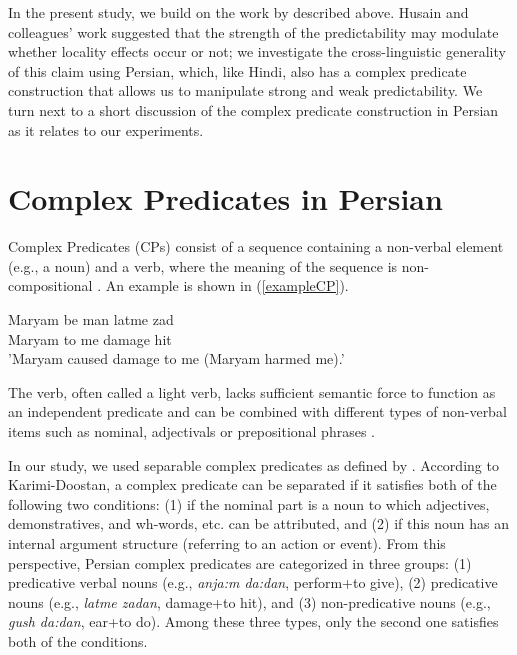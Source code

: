 \documentclass{frontiersSCNS}\usepackage{knitr} %
\begin{document}
In the present study, we build on the work by \cite{husain2014strong} described above. Husain and colleagues' work suggested that the strength of the predictability may modulate whether locality effects occur or not; we investigate the cross-linguistic generality of this claim using Persian, which, like Hindi, also has a complex predicate construction that allows us to manipulate strong and weak predictability. 
We turn next to a short discussion of the complex predicate construction in Persian as it relates to our experiments.

\section{Complex Predicates in Persian}

Complex Predicates (CPs)   consist of a sequence containing a non-verbal element (e.g., a  noun) and a verb, where the meaning of the sequence is non-compositional \citep{samvelian2001syntax}.  An example is shown in (\ref{exampleCP}).

\begin{exe}
\ex \label{exampleCP}
\gll Maryam be man latme zad \\
Maryam to me   damage hit\\
\glt 'Maryam caused damage to me (Maryam harmed me).'
\end{exe}

The verb, often called a light verb, lacks sufficient semantic force to function as an independent predicate \citep{vahedi1996syntax,karimi1997light,karimi2005light} and can be combined with different types of non-verbal items such as nominal, adjectivals or prepositional phrases \citep{dabir1997compound}. 

In our study, we used separable complex predicates as defined by \citet{karimi2011separability}. According to Karimi-Doostan, a complex predicate can be separated if it satisfies both of the following two conditions: (1) if the nominal part is a noun to which adjectives, demonstratives, and wh-words, etc. can be attributed, and (2) if this noun has an internal argument structure (referring to an action or event). From this perspective, Persian complex predicates are categorized in three groups: (1) predicative verbal nouns (e.g., \textit{anja:m da:dan}, perform+to give), (2) predicative nouns (e.g., \textit{latme zadan}, damage+to hit), and (3) non-predicative nouns (e.g., \textit{gush da:dan}, ear+to do). Among these three types, only the second one satisfies both of the conditions. 
\end{document}

